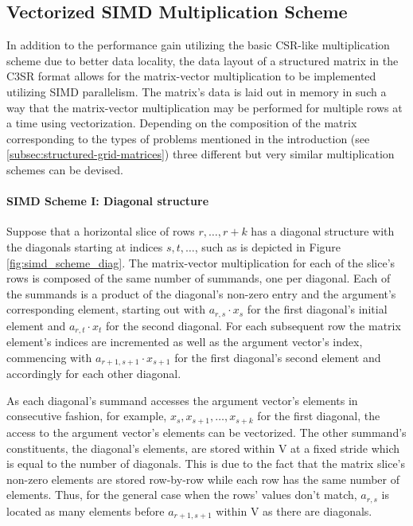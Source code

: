     \subsection{Vectorized SIMD Multiplication Scheme} \label{subsubsec:vectorized-simd-multiplication-scheme}

      In addition to the performance gain utilizing the basic CSR-like multiplication scheme due to better data locality, the data layout of a structured matrix in the C3SR format allows for the matrix-vector multiplication to be implemented utilizing SIMD parallelism. The matrix's data is laid out in memory in such a way that the matrix-vector multiplication may be performed for multiple rows at a time using vectorization. Depending on the composition of the matrix corresponding to the types of problems mentioned in the introduction (see \ref{subsec:structured-grid-matrices}) three different but very similar multiplication schemes can be devised.

      \paragraph{SIMD Scheme I: Diagonal structure}

      Suppose that a horizontal slice of rows $r, \ldots, r+k$ has a diagonal structure with the diagonals starting at indices $s, t, \ldots $, such as is depicted in Figure \ref{fig:simd_scheme_diag}. The matrix-vector multiplication for each of the slice's rows is composed of the same number of summands, one per diagonal. Each of the summands is a product of the diagonal's non-zero entry and the argument's corresponding element, starting out with $a_{r,s} \cdot x_s$ for the first diagonal's initial element and $a_{r,t} \cdot x_t$ for the second diagonal. For each subsequent row the matrix element's indices are incremented as well as the argument vector's index, commencing with $a_{r+1, s+1} \cdot x_{s+1}$ for the first diagonal's second element and accordingly for each other diagonal.

      As each diagonal's summand accesses the argument vector's elements in consecutive fashion, for example, $x_s, x_{s+1}, \ldots, x_{s + k}$ for the first diagonal, the access to the argument vector's elements can be vectorized. The other summand's constituents, the diagonal's elements, are stored within V at a fixed stride which is equal to the number of diagonals. This is due to the fact that the matrix slice's non-zero elements are stored row-by-row while each row has the same number of elements. Thus, for the general case when the rows' values don't match, $a_{r, s}$ is located as many elements before $a_{r+1, s+1}$ within V as there are diagonals.

